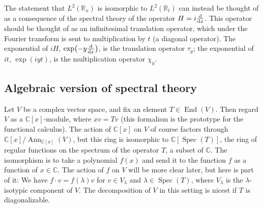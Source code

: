 \documentclass[11pt,leqno]{article}
\theoremstyle{plain}
\theoremstyle{definition}
\numberwithin{equation}{section}
\numberwithin{lem}{section}
\DeclareMathOperator{\End}{End}
\DeclareMathOperator{\Spec}{Spec}
\DeclareMathOperator{\Ann}{Ann}
\begin{document}
The statement that $L^2(\mathbb R_x)$ is isomorphic to $L^2(\mathbb R_t)$ can instead be thought of as a consequence of the spectral theory of the operator $H = i\dv{x}$. This operator should be thought of as an infinitesimal translation operator, which under the Fourier transform is sent to multiplication by $t$ (a diagonal operator). The exponential of $iH$, $\exp(-y\dv{x})$, is the translation operator $\tau_y$; the exponential of $it$, $\exp(iyt)$, is the multiplication operator $\chi_y$.

\subsection{Algebraic version of spectral theory}
Let $V$ be a complex vector space, and fix an element $T\in \End(V)$. Then regard $V$ as a $\mathbb C[x]$-module, where $xv = Tv$ (this formalism is the prototype for the functional calculus). The action of $\mathbb C[x]$ on $V$ of course factors through $\mathbb C[x]/\Ann_{\mathbb C[x]}(V)$, but this ring is isomorphic to $\mathbb C[\Spec(T)]$, the ring of regular functions on the spectrum of the operator $T$, a subset of $\mathbb C$. The isomorphism is to take a polynomial $f(x)$ and send it to the function $f$ as a function of $x\in\mathbb C$. The action of $f$ on $V$ will be more clear later, but here is part of it: We have $f\cdot v = f(\lambda)v$ for $v\in V_\lambda$ and $\lambda\in\Spec(T)$, where $V_\lambda$ is the $\lambda$-isotypic component of $V$. The decomposition of $V$ in this setting is nicest if $T$ is diagonalizable.
\end{document}
